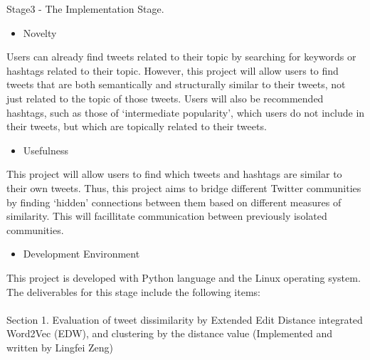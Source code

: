 \documentclass[10pt]{article}
\begin{document}
Stage3 - The Implementation Stage. \\

\begin{itemize}
	\item Novelty
\end{itemize}
Users can already find tweets related to their topic by searching for keywords or hashtags related to their topic. However, this project will allow users to find tweets that are both semantically and structurally similar to their tweets, not just related to the topic of those tweets. Users will also be recommended hashtags, such as those of ‘intermediate popularity’, which users do not include in their tweets, but which are topically related to their tweets.

\begin{itemize}
	\item Usefulness
\end{itemize}
This project will allow users to find which tweets and hashtags are similar to their own tweets. Thus, this project aims to bridge different Twitter communities by finding ‘hidden’ connections between them based on different measures of similarity. This will facillitate communication between previously isolated communities.
\begin{itemize}
	\item Development Environment
\end{itemize}	
This project is developed with Python language and the Linux operating system. \\
The deliverables for this stage include the following items:\\\\
Section 1. Evaluation of tweet dissimilarity by Extended Edit Distance integrated Word2Vec (EDW), and clustering by the distance value (Implemented and written by Lingfei Zeng)
\end{document}
